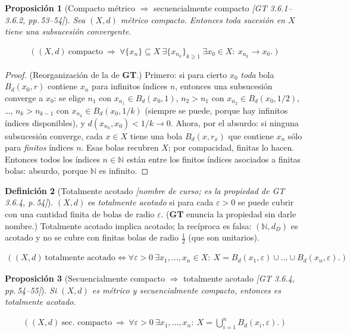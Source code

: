 \documentclass[11pt,a4paper]{article}
\newcommand{\lgc}[1]{\par\vspace{-3pt}\begin{gather*}\big(\;#1\;\big)\end{gather*}\vspace{-6pt}}
\theoremstyle{definition}
\newtheorem{definicion}{Definición}[section]
\theoremstyle{plain}
\newtheorem{proposicion}[definicion]{Proposición}
\newcommand{\fnt}[1]{{\normalfont\small\itshape\color{gray!150!black}[#1]}}
\newcommand{\N}{\mathbb{N}}
\newcommand{\Bola}[2]{B_d(#1,#2)}
\begin{document}
\begin{proposicion}[Compacto métrico $\Rightarrow$ secuencialmente compacto \fnt{GT 3.6.1--3.6.2, pp.\,53--54}]\label{cp:compsec}
Sea $(X,d)$ métrico compacto. Entonces toda sucesión en $X$ tiene una subsucesión convergente.
\lgc{(X,d)\ \text{compacto}\ \Rightarrow\ \forall\{x_n\}\subseteq X\ \exists\{x_{n_k}\}_{k\ge1}\ \exists x_0\in X:\ x_{n_k}\to x_0.}
\end{proposicion}

\begin{proof}
(Reorganización de la de \textbf{GT}.) Primero: si para cierto $x_0$ \emph{toda} bola $\Bola{x_0}{r}$ contiene $x_n$ para infinitos índices $n$, entonces una subsucesión converge a $x_0$: se elige $n_1$ con $x_{n_1}\in\Bola{x_0}{1}$, $n_2>n_1$ con $x_{n_2}\in\Bola{x_0}{1/2}$, \dots, $n_k>n_{k-1}$ con $x_{n_k}\in\Bola{x_0}{1/k}$ (siempre se puede, porque hay infinitos índices disponibles), y $d(x_{n_k},x_0)<1/k\to0$.
Ahora, por el absurdo: si ninguna subsucesión converge, cada $x\in X$ tiene una bola $\Bola{x}{r_x}$ que contiene $x_n$ sólo para \emph{finitos} índices $n$. Esas bolas recubren $X$; por compacidad, finitas lo hacen. Entonces todos los índices $n\in\N$ están entre los finitos índices asociados a finitas bolas: absurdo, porque $\N$ es infinito.
\end{proof}

\begin{definicion}[Totalmente acotado \fnt{nombre de curso; es la propiedad de GT 3.6.4, p.\,54}]
$(X,d)$ es \emph{totalmente acotado} si para cada $\varepsilon>0$ se puede cubrir con una cantidad finita de bolas de radio $\varepsilon$. (\textbf{GT} enuncia la propiedad sin darle nombre.) Totalmente acotado implica acotado; la recíproca es falsa: $(\N,d_D)$ es acotado y no se cubre con finitas bolas de radio $\tfrac12$ (que son unitarios).
\lgc{(X,d)\ \text{totalmente acotado}\iff \forall\varepsilon>0\ \exists x_1,\dots,x_n\in X:\ X=\Bola{x_1}{\varepsilon}\cup\dots\cup\Bola{x_n}{\varepsilon}.}
\end{definicion}

\begin{proposicion}[Secuencialmente compacto $\Rightarrow$ totalmente acotado \fnt{GT 3.6.4, pp.\,54--55}]\label{cp:totac}
Si $(X,d)$ es métrico y secuencialmente compacto, entonces es totalmente acotado.
\lgc{(X,d)\ \text{sec. compacto}\ \Rightarrow\ \forall\varepsilon>0\ \exists x_1,\dots,x_n:\ X=\textstyle\bigcup_{i=1}^n\Bola{x_i}{\varepsilon}.}
\end{proposicion}
\end{document}
